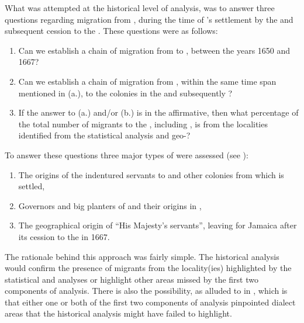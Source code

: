 {{{What was attempted at the historical level of analysis, was to answer three questions regarding migration from , during the time of 's settlement by the  and subsequent cession to the . These questions were as follows:

\begin{enumerate}
\item {Can we establish a chain of migration from  to , between the years 1650 and 1667?}
\item{Can we establish a chain of migration from , within the same time span mentioned in (a.), to the  colonies in the  and subsequently ?}
\item{If the answer to (a.) and/or (b.) is in the affirmative, then what percentage of the total number of migrants to the , including , is from the localities identified from the statistical analysis and geo-?}
\end{enumerate}

To answer these questions three major types of  were assessed (see ):

\begin{enumerate}
  \item {The origins of the  indentured servants to  and other  colonies from which  is settled,}
  \item {Governors and big planters of  and their origins in ,}
  \item {The  geographical origin of ``His Majesty's servants'', leaving  for Jamaica after its cession to the  in 1667.}
\end{enumerate}

The rationale behind this approach was fairly simple. The historical analysis would confirm the presence of migrants from the locality(ies) highlighted by the statistical and  analyses or highlight other areas missed by the first two components of analysis. There is also the possibility, as alluded to in , which is that either one or both of the first two components of analysis pinpointed dialect areas that the historical analysis might have failed to highlight.

}}}
